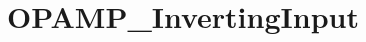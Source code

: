 \hypertarget{group___o_p_a_m_p___inverting_input}{\section{O\-P\-A\-M\-P\-\_\-\-Inverting\-Input}
\label{group___o_p_a_m_p___inverting_input}
}
